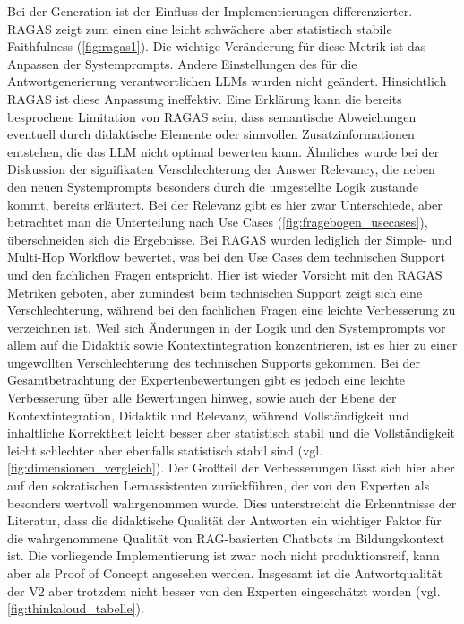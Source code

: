 Bei der Generation ist der Einfluss der Implementierungen differenzierter.
RAGAS zeigt zum einen eine leicht schwächere aber statistisch stabile Faithfulness (\autoref{fig:ragas1}).
Die wichtige Veränderung für diese Metrik ist das Anpassen der Systemprompts.
Andere Einstellungen des für die Antwortgenerierung verantwortlichen LLMs wurden nicht geändert.
Hinsichtlich RAGAS ist diese Anpassung ineffektiv.
Eine Erklärung kann die bereits besprochene Limitation von RAGAS sein, dass semantische Abweichungen eventuell durch didaktische Elemente oder sinnvollen Zusatzinformationen entstehen, die das LLM nicht optimal bewerten kann.
Ähnliches wurde bei der Diskussion der signifikaten Verschlechterung der Answer Relevancy, die neben den neuen Systemprompts besonders durch die umgestellte Logik zustande kommt, bereits erläutert.
Bei der Relevanz gibt es hier zwar Unterschiede, aber betrachtet man die Unterteilung nach Use Cases (\autoref{fig:fragebogen_usecases}), überschneiden sich die Ergebnisse.
Bei RAGAS wurden lediglich der Simple- und Multi-Hop Workflow bewertet, was bei den Use Cases dem technischen Support und den fachlichen Fragen entspricht.
Hier ist wieder Vorsicht mit den RAGAS Metriken geboten, aber zumindest beim technischen Support zeigt sich eine Verschlechterung, während bei den fachlichen Fragen eine leichte Verbesserung zu verzeichnen ist.
Weil sich Änderungen in der Logik und den Systemprompts vor allem auf die Didaktik sowie Kontextintegration konzentrieren, ist es hier zu einer ungewollten Verschlechterung des technischen Supports gekommen.
Bei der Gesamtbetrachtung der Expertenbewertungen gibt es jedoch eine leichte Verbesserung über alle Bewertungen hinweg, sowie auch der Ebene der Kontextintegration, Didaktik und Relevanz, während Vollständigkeit und inhaltliche Korrektheit leicht besser aber statistisch stabil und die Vollständigkeit leicht schlechter aber ebenfalls statistisch stabil sind (vgl. \autoref{fig:dimensionen_vergleich}).
Der Großteil der Verbesserungen lässt sich hier aber auf den sokratischen Lernassistenten zurückführen, der von den Experten als besonders wertvoll wahrgenommen wurde.
Dies unterstreicht die Erkenntnisse der Literatur, dass die didaktische Qualität der Antworten ein wichtiger Faktor für die wahrgenommene Qualität von RAG-basierten Chatbots im Bildungskontext ist.
Die vorliegende Implementierung ist zwar noch nicht produktionsreif, kann aber als Proof of Concept angesehen werden.
Insgesamt ist die Antwortqualität der V2 aber trotzdem nicht besser von den Experten eingeschätzt worden (vgl. \autoref{fig:thinkaloud_tabelle}).

